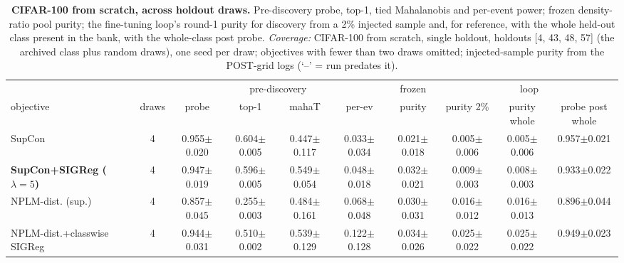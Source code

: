 \begin{landscape}
\begin{table}[p]
\centering
\footnotesize
\setlength{\tabcolsep}{3pt}
\begin{tabular}{lccccccccc}
\toprule
& & \multicolumn{4}{c}{pre-discovery} & frozen & \multicolumn{3}{c}{loop} \\
\cmidrule(lr){3-6}\cmidrule(lr){7-7}\cmidrule(lr){8-10}
objective & draws & probe & top-1 & mahaT & per-ev & purity & purity 2\% & purity whole & probe post whole \\
\midrule
SupCon & 4 & 0.955$\pm$0.020 & 0.604$\pm$0.005 & 0.447$\pm$0.117 & 0.033$\pm$0.034 & 0.021$\pm$0.018 & 0.005$\pm$0.006 & 0.005$\pm$0.006 & 0.957$\pm$0.021 \\
\textbf{SupCon+SIGReg ($\lambda{=}5$)} & 4 & 0.947$\pm$0.019 & 0.596$\pm$0.005 & 0.549$\pm$0.054 & 0.048$\pm$0.018 & 0.032$\pm$0.021 & 0.009$\pm$0.003 & 0.008$\pm$0.003 & 0.933$\pm$0.022 \\
NPLM-dist. (sup.) & 4 & 0.857$\pm$0.045 & 0.255$\pm$0.003 & 0.484$\pm$0.161 & 0.068$\pm$0.048 & 0.030$\pm$0.031 & 0.016$\pm$0.012 & 0.016$\pm$0.013 & 0.896$\pm$0.044 \\
NPLM-dist.+classwise SIGReg & 4 & 0.944$\pm$0.031 & 0.510$\pm$0.002 & 0.539$\pm$0.129 & 0.122$\pm$0.128 & 0.034$\pm$0.026 & 0.025$\pm$0.022 & 0.025$\pm$0.022 & 0.949$\pm$0.023 \\
\bottomrule
\end{tabular}
\caption{\textbf{CIFAR-100 from scratch, across holdout draws.} Pre-discovery probe, top-1, tied Mahalanobis and per-event power; frozen density-ratio pool purity; the fine-tuning loop's round-1 purity for discovery from a 2\% injected sample and, for reference, with the whole held-out class present in the bank, with the whole-class post probe. \emph{Coverage:} CIFAR-100 from scratch, single holdout, holdouts [4, 43, 48, 57] (the archived class plus random draws), one seed per draw; objectives with fewer than two draws omitted; injected-sample purity from the POST-grid logs (`--' = run predates it).}
\label{tab:app_cifar100_scratch_draws}
\end{table}
\end{landscape}
